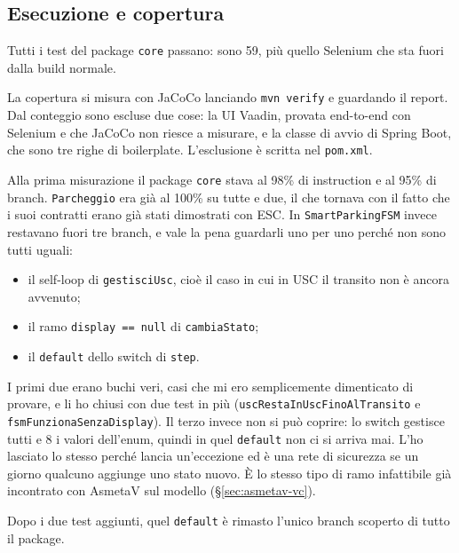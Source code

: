 \subsection{Esecuzione e copertura}


Tutti i test del package \texttt{core} passano: sono 59, più quello Selenium che sta
fuori dalla build normale.

La copertura si misura con JaCoCo lanciando \texttt{mvn verify} e guardando il report. Dal conteggio sono escluse due cose: la UI Vaadin,
provata end-to-end con Selenium e che JaCoCo non riesce a misurare, e la classe di
avvio di Spring Boot, che sono tre righe di boilerplate. L'esclusione è scritta nel
\texttt{pom.xml}.

Alla prima misurazione il package \texttt{core} stava al 98\% di instruction e al 95\% di
branch. \texttt{Parcheggio} era già al 100\% su tutte e due, il che tornava con il fatto
che i suoi contratti erano già stati dimostrati con ESC. In \texttt{SmartParkingFSM}
invece restavano fuori tre branch, e vale la pena guardarli uno per uno perché non sono
tutti uguali:

\begin{itemize}
\item il self-loop di \texttt{gestisciUsc}, cioè il caso in cui in USC il transito non è
ancora avvenuto;
\item il ramo \texttt{display == null} di \texttt{cambiaStato};
\item il \texttt{default} dello switch di \texttt{step}.
\end{itemize}

I primi due erano buchi veri, casi che mi ero semplicemente dimenticato di provare, e li
ho chiusi con due test in più (\texttt{uscRestaInUscFinoAlTransito} e
\texttt{fsmFunzionaSenzaDisplay}). Il terzo invece non si può coprire: lo switch gestisce
tutti e 8 i valori dell'enum, quindi in quel \texttt{default} non ci si arriva mai. L'ho
lasciato lo stesso perché lancia un'eccezione ed è una rete di sicurezza se un giorno
qualcuno aggiunge uno stato nuovo. È lo stesso tipo di ramo infattibile già incontrato
con AsmetaV sul modello (\S\ref{sec:asmetav-vc}).

Dopo i due test aggiunti, quel \texttt{default} è rimasto l'unico branch scoperto di
tutto il package.



